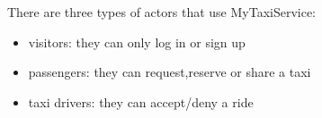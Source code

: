 There are three types of actors that use MyTaxiService:
\begin{itemize}
	\item visitors: they can only log in or sign up
	
	\item passengers: they can request,reserve or share a taxi
	
	\item taxi drivers: they can accept/deny a ride
	
\end{itemize}